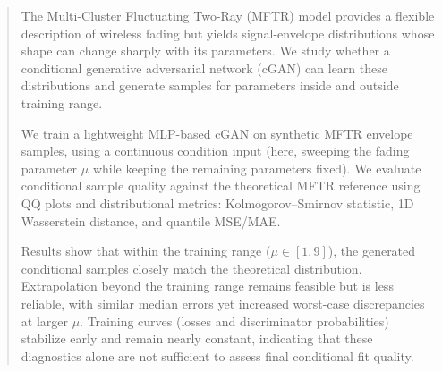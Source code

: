 \begin{abstract}
The Multi-Cluster Fluctuating Two-Ray (MFTR) model provides a flexible description of wireless fading but yields signal-envelope distributions whose shape can change sharply with its parameters. We study whether a conditional generative adversarial network (cGAN) can learn these distributions and generate samples for parameters inside and outside training range.

We train a lightweight MLP-based cGAN on synthetic MFTR envelope samples, using a continuous condition input (here, sweeping the fading parameter $\mu$ while keeping the remaining parameters fixed). We evaluate conditional sample quality against the theoretical MFTR reference using QQ plots and distributional metrics: Kolmogorov--Smirnov statistic, 1D Wasserstein distance, and quantile MSE/MAE.

Results show that within the training range ($\mu\in[1,9]$), the generated conditional samples closely match the theoretical distribution. Extrapolation beyond the training range remains feasible but is less reliable, with similar median errors yet increased worst-case discrepancies at larger $\mu$. Training curves (losses and discriminator probabilities) stabilize early and remain nearly constant, indicating that these diagnostics alone are not sufficient to assess final conditional fit quality.
\end{abstract}